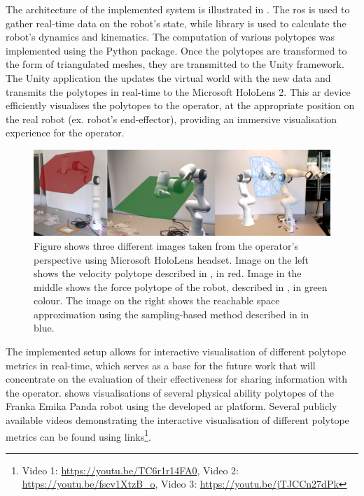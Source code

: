 The architecture of the implemented system is illustrated in . The \gls{ros} is used to gather real-time data on the robot's state, while  \cite{pinocchio2021} library is used to calculate the robot's dynamics and kinematics. The computation of various polytopes was implemented using the  Python package. Once the polytopes are transformed to the form of triangulated meshes, they are transmitted to the Unity framework. The Unity application the updates the virtual world with the new data and transmits the polytopes in real-time to the Microsoft HoloLens 2. This \gls{ar} device efficiently visualises the polytopes to the operator, at the appropriate position on the real robot (ex. robot's end-effector), providing an immersive visualisation experience for the operator.

\begin{figure}[!h]
    \centering
    \includegraphics[width=\linewidth]{Papers/images/ar_poly_dirty.png}
    \caption{Figure shows three different images taken from the operator's perspective using Microsoft HoloLens headset. Image on the left shows the velocity polytope described in , in red. Image in the middle shows the force polytope of the robot, described in , in green colour. The image on the right shows the reachable space approximation using the sampling-based method described in  in blue.}
    \label{fig:ar_images}
\end{figure}


The implemented setup allows for interactive visualisation of different polytope metrics in real-time, which serves as a base for the future work that will concentrate on the evaluation of their effectiveness for sharing information with the operator.  shows visualisations of several physical ability polytopes of the Franka Emika Panda robot using the developed \gls{ar} platform. Several publicly available videos demonstrating the interactive visualisation of different polytope metrics can be found using links\footnote{Video 1: \url{https://youtu.be/TC6r1r14FA0}, Video 2: \url{https://youtu.be/fscv1XtzB_o}, Video 3: \url{https://youtu.be/jTJCCn27dPk}}.



